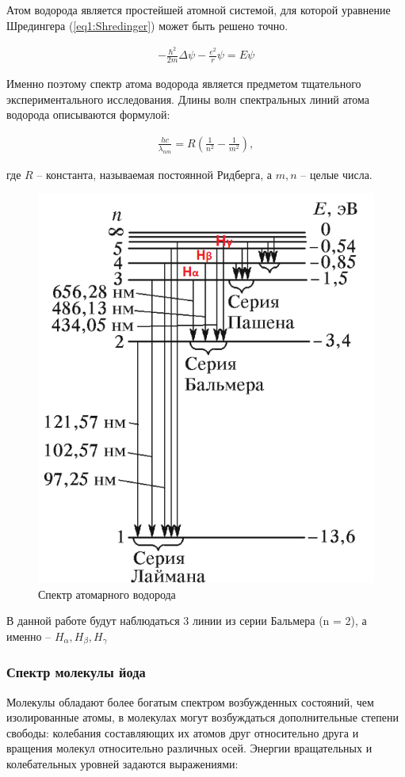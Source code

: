 \documentclass[a4paper,12pt]{article}
\begin{document}
Атом водорода является простейшей атомной системой, для которой уравнение Шредингера (\ref{eq1:Shredinger}) может быть решено точно. 

\begin{align} \label{eq1:Shredinger}
	-\frac{\hbar^2}{2m} \Delta \psi - \frac{e^2}{r} \psi = E \psi
\end{align}

Именно поэтому спектр атома водорода является предметом тщательного экспериментального исследования. Длины волн спектральных линий атома водорода описываются формулой:

\begin{align}
	\frac{hc}{\lambda_{nm}} = R \left( \frac{1}{n^2} - \frac{1}{m^2} \right),
\end{align}

где $R$ -- константа, называемая постоянной Ридберга, а $m, n$ -- целые числа.

\begin{figure}[h!]
	\centering
	\includegraphics[width=0.6\linewidth]{Hydrogen_spectre}
	\caption{Спектр атомарного водорода}
\end{figure}


В данной работе будут наблюдаться 3 линии из серии Бальмера (n = 2), а именно -- $H_{\alpha}, H_{\beta}, H_{\gamma}$

\pagebreak

\subsubsection*{Спектр молекулы йода}

Молекулы обладают более богатым спектром возбужденных состояний, чем изолированные атомы, в молекулах могут возбуждаться дополнительные степени свободы: колебания составляющих их атомов друг относительно друга и вращения молекул относительно различных осей. Энергии вращательных и колебательных уровней задаются выражениями:
\end{document}
